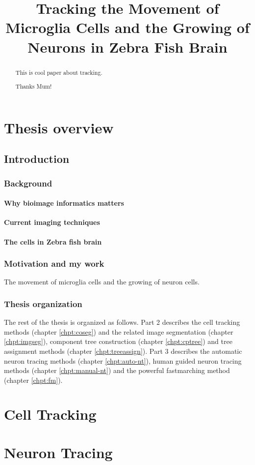 \documentclass[b5,12pt]{report}
\title{Tracking the Movement of Microglia Cells and the Growing of Neurons in Zebra Fish Brain}
\begin{document}
\maketitle
\begin{abstract}
 This is cool paper about tracking.
\end{abstract}
\renewcommand{\abstractname}{Acknowledgements}
\begin{abstract}
 Thanks Mum!
\end{abstract}

\tableofcontents
\listoffigures
\part{Thesis overview}
\chapter{Introduction}
\section{Background}
\subsection{Why bioimage informatics matters}
\subsection{Current imaging techniques}
\subsection{The cells in Zebra fish brain}
\section{Motivation and my work}
The movement of microglia cells and the growing of neuron cells.
\section{Thesis organization}
The rest of the thesis is organized as follows. Part 2 describes the cell tracking methods (chapter \ref{chpt:coseg}) and the related image segmentation (chapter \ref{chpt:imgseg}), component tree construction (chapter \ref{chpt:cptree}) and tree assignment methods (chapter \ref{chpt:treeassign}). Part 3 describes the automatic neuron tracing methods (chapter \ref{chpt:auto-nt}), human guided neuron tracing methods (chapter \ref{chpt:manual-nt}) and the powerful fastmarching method (chapter \ref{chpt:fm}).
\part{Cell Tracking}
\part{Neuron Tracing}





\end{document}
